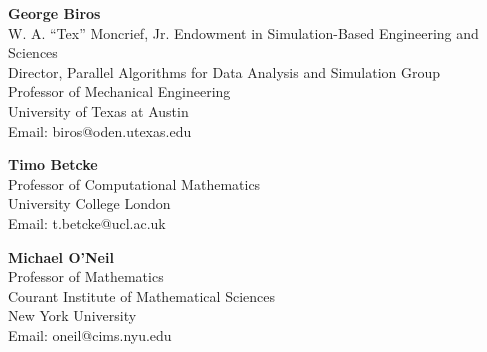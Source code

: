 \documentclass[10pt,margin]{res}
\begin{document}
\begin{resume}
\textbf{George Biros}\\
W. A. ``Tex'' Moncrief, Jr. Endowment in Simulation-Based Engineering and Sciences\\
Director, Parallel Algorithms for Data Analysis and Simulation Group\\
Professor of Mechanical Engineering\\
University of Texas at Austin\\
Email: biros@oden.utexas.edu

\textbf{Timo Betcke}\\
Professor of Computational Mathematics\\
University College London\\
Email: t.betcke@ucl.ac.uk

\textbf{Michael O'Neil}\\
Professor of Mathematics\\
Courant Institute of Mathematical Sciences\\
New York University \\
Email: oneil@cims.nyu.edu 
\fi

\end{resume}
\end{document}
